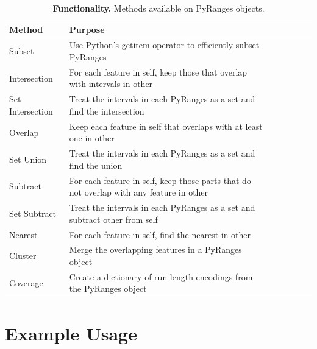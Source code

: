 \documentclass[10pt,letterpaper]{article}
\begin{document}
\begin{table}[!ht]
\begin{adjustwidth}{-1.5in}{0in}
\centering
\caption{{\bf Functionality.} Methods available on PyRanges objects.}
\begin{tabular}{|l|l|l|l|l|l|l|}
\hline
  {\bf Method} & {\bf Purpose} \\ \hline
  Subset & Use Python's getitem operator to efficiently subset PyRanges \\ \hline
  Intersection & For each feature in self, keep those that overlap with intervals in other \footnotemark \\ \hline
  Set Intersection & Treat the intervals in each PyRanges as a set and find the intersection \footnotemark \\ \hline
  Overlap & Keep each feature in self that overlaps with at least one in other \\ \hline
  Set Union & Treat the intervals in each PyRanges as a set and find the union \\ \hline
  Subtract & For each feature in self, keep those parts that do not overlap with any feature in other \\ \hline
  Set Subtract & Treat the intervals in each PyRanges as a set and subtract other from self \\ \hline
  Nearest & For each feature in self, find the nearest in other \\ \hline
  Cluster & Merge the overlapping features in a PyRanges object \\ \hline
  Coverage & Create a dictionary of run length encodings from the PyRanges object \\ \hline
\end{tabular}
\label{tab1}
\end{adjustwidth}
\end{table}


\section*{Example Usage}
\end{document}
